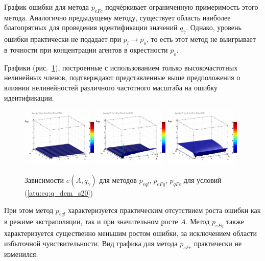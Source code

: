 График ошибки для метода $p_{eFc}$ подчёркивает ограниченную примеримость этого метода.
Аналогично предыдущему методу, существует область наиболее благопрятных для
проведения идентификации значений $q_\gamma$. Однако,
уровень ошибки практически не подадает при $p_l \to p_o$,
то есть этот метод не выигрывает в точности при концентрации
агентов в окрестности $p_o$.

Графики (рис.~\ref{atu:f:qsl_pe_A_qg_s20}), построенные с использованием
только высокочастотных нелинейных членов,
подтверждают представленные выше предположения
о влиянии нелинейностей различного частотного масштаба
на ошибку идентификации.

\begin{figure}[htb!]
  \centerline{
    \includegraphics[width=0.32\textwidth]{p/qls_pe-p_A_qg_eql_s20.png}
    \hfill
    \includegraphics[width=0.32\textwidth]{p/qls_pe-p_A_qg_eFq_s20.png}
    \hfill
    \includegraphics[width=0.32\textwidth]{p/qls_pe-p_A_qg_eFc_s20.png}
  }
  \caption{Зависимости $e(A,q_\gamma)$ для методов $p_{eql}$, $p_{eFq}$, $p_{qFc}$ для условий (\ref{atu:eq:q_dem_s20})}
  \label{atu:f:qsl_pe_A_qg_s20}
\end{figure}

При этом метод $p_{eql}$ характеризуется практическим отсутствием роста
ошибки как в режиме экстраполяции, так и при значительном росте $A$.
Метод $p_{eFq}$ также характеризуется существенно меньшим ростом
ошибки, за исключением области избыточной чувствительности.
Вид графика для метода $p_{eFc}$ практически не изменился.


